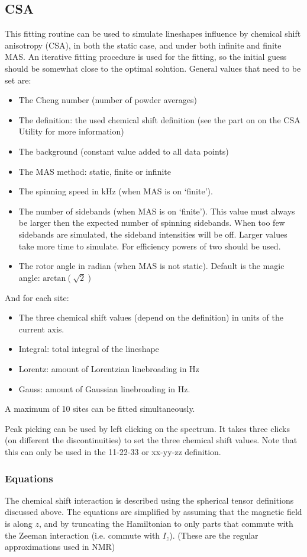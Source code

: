 \documentclass[11pt,a4paper]{article}
\begin{document}
\subsection{CSA}
This fitting routine can be used to simulate lineshapes influence by chemical shift anisotropy
(CSA), in both the static case, and under both infinite and finite MAS. An iterative fitting
procedure is used for the fitting, so the initial guess should be somewhat close to the optimal
solution. General values that need to be set are:
\begin{itemize}
\item The Cheng number (number of powder averages)
\item The definition: the used chemical shift definition (see the part on on the CSA Utility for more information)
\item The background (constant value added to all data points)
\item The MAS method: static, finite or infinite
\item The spinning speed in kHz (when MAS is on `finite').
\item The number of sidebands (when MAS is on `finite'). This value must always be larger then the
  expected number of spinning sidebands. When too few sidebands are simulated, the sideband intensities will be off. Larger values take more time to simulate. For efficiency powers of two should be used.
\item The rotor angle in radian (when MAS is not static). Default is the magic angle:
	 $\text{arctan}(\sqrt{2})$
\end{itemize}
And for each site:
\begin{itemize}
\item The three chemical shift values (depend on the definition) in units of the current axis.
\item Integral: total integral of the lineshape
\item Lorentz: amount of Lorentzian linebroading in Hz
\item Gauss: amount of Gaussian linebroading in Hz.
\end{itemize}
A maximum of 10 sites can be fitted simultaneously.

Peak picking can be used by left clicking on the spectrum. It takes three clicks (on different the
discontinuities) to set the three chemical shift values. Note that this can only be used in the 11-22-33 or
xx-yy-zz definition.


\subsubsection*{Equations}
The chemical shift interaction is described using the spherical tensor definitions discussed
above. The equations are simplified by assuming that the magnetic field is along $z$, and by
truncating the Hamiltonian to only parts that commute with the Zeeman interaction (i.e. commute
with $I_z$). (These are the regular approximations used in NMR)
\end{document}
